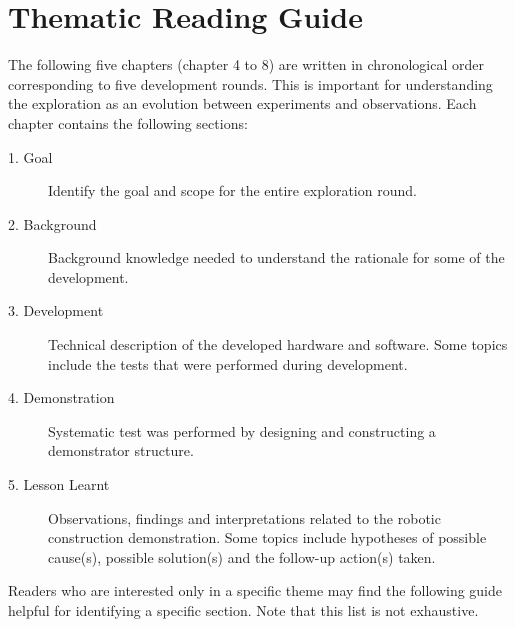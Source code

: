 \section{Thematic Reading Guide}
\label{section:methodology-thematic-reading-guide}

The following five chapters (chapter 4 to 8) are written in chronological order corresponding to five development rounds. This is important for understanding the exploration as an evolution between experiments and observations.  Each chapter contains the following sections:

\begin{description}
	\item [1. Goal] Identify the goal and scope for the entire exploration round.
	\item [2. Background] Background knowledge needed to understand the rationale for some of the development.
	\item [3. Development] Technical description of the developed hardware and software. Some topics include the tests that were performed during development.	
    \item [4. Demonstration] Systematic test was performed by designing and constructing a demonstrator structure.
	\item [5. Lesson Learnt] Observations, findings and interpretations related to the robotic construction demonstration. Some topics include hypotheses of possible cause(s), possible solution(s) and the follow-up action(s) taken. 
\end{description}

Readers who are interested only in a specific theme may find the following guide helpful for identifying a specific section. Note that this list is not exhaustive. 

